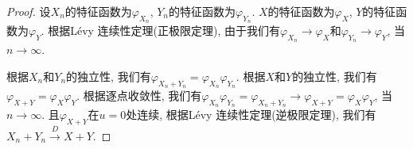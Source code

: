 \documentclass[UTF8, a4paper]{article}
\begin{document}
\begin{proof}
设\(X_n\)的特征函数为\(\varphi_{X_n}\), \(Y_n\)的特征函数为\(\varphi_{Y_n}\).
\(X\)的特征函数为\(\varphi_X\), \(Y\)的特征函数为\(\varphi_Y\).
根据L\'evy 连续性定理(正极限定理), 由于我们有\(\varphi_{X_n} \to \varphi_X\)和\(\varphi_{Y_n} \to \varphi_Y\), 当\(n \to \infty\).

根据\(X_n\)和\(Y_n\)的独立性, 我们有\(\varphi_{X_n + Y_n} = \varphi_{X_n} \varphi_{Y_n}\).
根据\(X\)和\(Y\)的独立性, 我们有\(\varphi_{X + Y} = \varphi_X \varphi_Y\).
根据逐点收敛性, 我们有\( \varphi_{X_n} \varphi_{Y_n} = \varphi_{X_n + Y_n} \to \varphi_{X + Y} = \varphi_X \varphi_Y\), 当\(n \to \infty\).
且\(\varphi_{X + Y}\)在\(u = 0\)处连续,
根据L\'evy 连续性定理(逆极限定理), 我们有\(X_n + Y_n \xrightarrow{D} X + Y\).
\end{proof}





\end{document}
